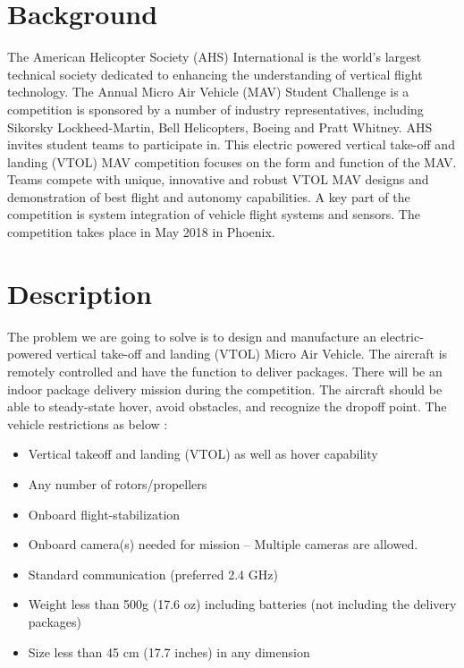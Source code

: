 \documentclass[letterpaper,10pt,draftclsnofoot,onecolumn]{IEEEtran}
\begin{document}
\clearpage
\begin{flushleft}

\section{Background}
The American Helicopter Society (AHS) International is the world’s largest technical society dedicated to enhancing the understanding of vertical flight technology. The Annual Micro Air Vehicle (MAV) Student Challenge is a competition is sponsored by a number of industry representatives, including Sikorsky Lockheed-Martin, Bell Helicopters, Boeing and Pratt Whitney. AHS invites student teams to participate in. This electric powered vertical take-off and landing (VTOL) MAV competition focuses on the form and function of the MAV. Teams compete with unique, innovative and robust VTOL MAV designs and demonstration of best flight and autonomy capabilities. A key part of the competition is system integration of vehicle flight systems and sensors. The competition takes place in May 2018 in Phoenix.

\section{Description}
The problem we are going to solve is to design and manufacture an electric-powered vertical take-off and landing (VTOL) Micro Air Vehicle. The aircraft is remotely controlled and have the function to deliver packages. There will be an indoor package delivery mission during the competition. The aircraft should be able to steady-state hover, avoid obstacles, and recognize the dropoff point. The vehicle restrictions as below :
\begin{itemize}
\item Vertical takeoff and landing (VTOL) as well as hover capability
\item Any number of rotors/propellers
\item Onboard flight-stabilization 
\item Onboard camera(s) needed for mission – Multiple cameras are allowed.
\item Standard communication (preferred 2.4 GHz)
\item Weight less than 500g (17.6 oz) including batteries (not including the delivery packages)
\item Size less than 45 cm (17.7 inches) in any dimension
\end{itemize}
\par



\end{flushleft}
\end{document}
